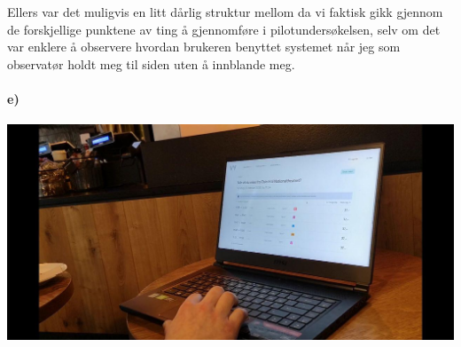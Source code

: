 \documentclass{../../myassignment}
\begin{document}
	Ellers var det muligvis en litt dårlig struktur mellom da vi faktisk gikk gjennom de forskjellige punktene av ting å gjennomføre i pilotundersøkelsen, selv om det var enklere å observere hvordan brukeren benyttet systemet når jeg som observatør holdt meg til siden uten å innblande meg.

	\newpage
	\paragraph*{e)}
	\includegraphics[scale=0.25]{pictures2/traveltimes.jpg}
\end{document}
